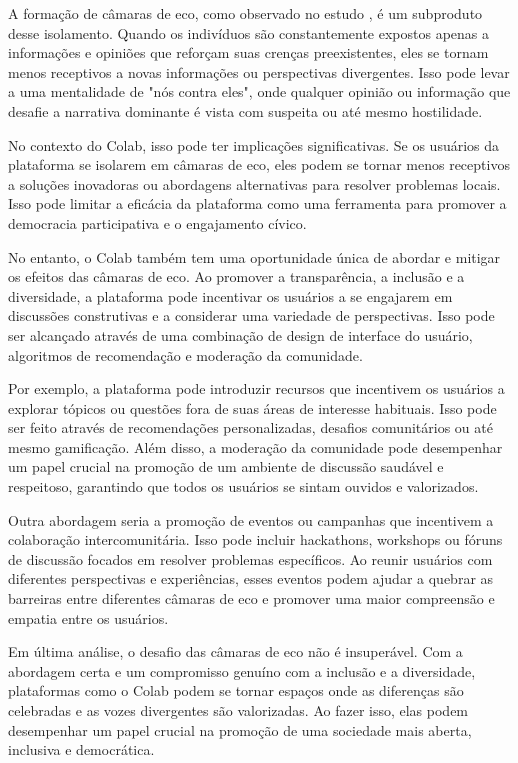 A formação de câmaras de eco, como observado no estudo , é um subproduto desse isolamento. Quando os indivíduos são constantemente expostos apenas a informações e opiniões que reforçam suas crenças preexistentes, eles se tornam menos receptivos a novas informações ou perspectivas divergentes. Isso pode levar a uma mentalidade de "nós contra eles", onde qualquer opinião ou informação que desafie a narrativa dominante é vista com suspeita ou até mesmo hostilidade.

No contexto do Colab, isso pode ter implicações significativas. Se os usuários da plataforma se isolarem em câmaras de eco, eles podem se tornar menos receptivos a soluções inovadoras ou abordagens alternativas para resolver problemas locais. Isso pode limitar a eficácia da plataforma como uma ferramenta para promover a democracia participativa e o engajamento cívico.

No entanto, o Colab também tem uma oportunidade única de abordar e mitigar os efeitos das câmaras de eco. Ao promover a transparência, a inclusão e a diversidade, a plataforma pode incentivar os usuários a se engajarem em discussões construtivas e a considerar uma variedade de perspectivas. Isso pode ser alcançado através de uma combinação de design de interface do usuário, algoritmos de recomendação e moderação da comunidade.

Por exemplo, a plataforma pode introduzir recursos que incentivem os usuários a explorar tópicos ou questões fora de suas áreas de interesse habituais. Isso pode ser feito através de recomendações personalizadas, desafios comunitários ou até mesmo gamificação. Além disso, a moderação da comunidade pode desempenhar um papel crucial na promoção de um ambiente de discussão saudável e respeitoso, garantindo que todos os usuários se sintam ouvidos e valorizados.

Outra abordagem seria a promoção de eventos ou campanhas que incentivem a colaboração intercomunitária. Isso pode incluir hackathons, workshops ou fóruns de discussão focados em resolver problemas específicos. Ao reunir usuários com diferentes perspectivas e experiências, esses eventos podem ajudar a quebrar as barreiras entre diferentes câmaras de eco e promover uma maior compreensão e empatia entre os usuários.

Em última análise, o desafio das câmaras de eco não é insuperável. Com a abordagem certa e um compromisso genuíno com a inclusão e a diversidade, plataformas como o Colab podem se tornar espaços onde as diferenças são celebradas e as vozes divergentes são valorizadas. Ao fazer isso, elas podem desempenhar um papel crucial na promoção de uma sociedade mais aberta, inclusiva e democrática.

